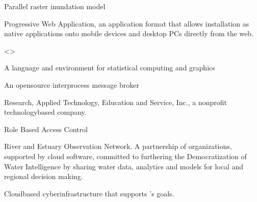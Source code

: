 \documentclass[letterpaper,12pt,english,openany,oneside]{sphinxmanual}
\begin{document}
\begin{description}
\sphinxAtStartPar
Parallel raster inundation model

\sphinxAtStartPar
Progressive Web Application, an application format that allows installation as native applications onto mobile devices and desktop PCs directly from the web.

\sphinxAtStartPar
\textless{}\textgreater{}

\sphinxAtStartPar
A language and environment for statistical computing and graphics

\sphinxAtStartPar
An open\sphinxhyphen{}source inter\sphinxhyphen{}process message broker

\sphinxAtStartPar
Research, Applied Technology, Education and Service, Inc., a non\sphinxhyphen{}profit technology\sphinxhyphen{}based company.

\sphinxAtStartPar
Role Based Access Control

\sphinxAtStartPar
River and Estuary Observation Network. A partnership of organizations, supported by cloud software, committed to furthering the Democratization of Water Intelligence by sharing water data, analytics and models for local and regional decision making.

\sphinxAtStartPar
Cloud\sphinxhyphen{}based cyber\sphinxhyphen{}infrastructure that supports {\hyperref[\detokenize{_static/glossary:term-REON}]{}}’s goals.


\end{description}
\end{document}

